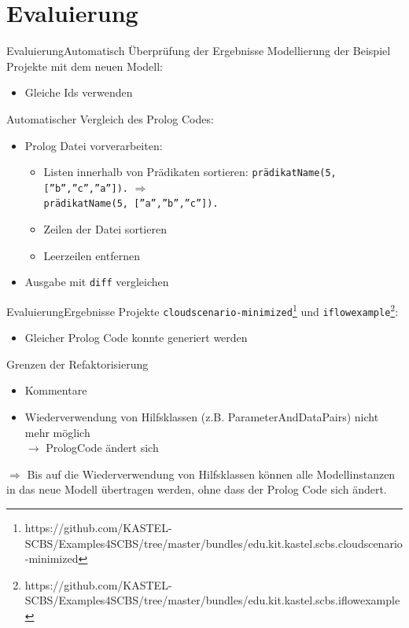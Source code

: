 \documentclass{sdqbeamer}
\begin{document}
\section{Evaluierung}
\begin{frame}{Evaluierung}{Automatisch Überprüfung der Ergebnisse}
	Modellierung der Beispiel Projekte mit dem neuen Modell:
	\begin{itemize}
		\item Gleiche Ids verwenden
	\end{itemize}
\vspace{0.05\textheight}
	Automatischer Vergleich des Prolog Codes:
	\begin{itemize}
		\item Prolog Datei vorverarbeiten:
		\begin{itemize}
			\item Listen innerhalb von Prädikaten sortieren:
			\hspace{0.05\textwidth}\texttt{prädikatName(5, [''b'',''c'',''a'']).} $\Rightarrow$ \\ \hspace{0.394\textwidth} \texttt{prädikatName(5, [''a'',''b'',''c'']).}
			\item Zeilen der Datei sortieren
			\item Leerzeilen entfernen
		\end{itemize}
		\item Ausgabe mit \texttt{diff} vergleichen
	\end{itemize}
\end{frame}
\begin{frame}{Evaluierung}{Ergebnisse}
		Projekte \texttt{cloudscenario-minimized}\footnote{https://github.com/KASTEL-SCBS/Examples4SCBS/tree/master/bundles/edu.kit.kastel.scbs.cloudscenario-minimized} und \texttt{iflowexample}\footnote{https://github.com/KASTEL-SCBS/Examples4SCBS/tree/master/bundles/edu.kit.kastel.scbs.iflowexample}:
		\begin{itemize}
			\item Gleicher Prolog Code konnte generiert werden
		\end{itemize}
		\vspace{0.05\textheight}
		Grenzen der Refaktorisierung
		\begin{itemize}
			\item Kommentare
			\item Wiederverwendung von Hilfsklassen (z.B. ParameterAndDataPairs) nicht mehr möglich\\ $\rightarrow$ PrologCode ändert sich
		\end{itemize}
	$\Rightarrow$ Bis auf die Wiederverwendung von Hilfsklassen können alle Modellinstanzen in das neue Modell übertragen werden, ohne dass der Prolog Code sich ändert.
\end{frame}
\end{document}
